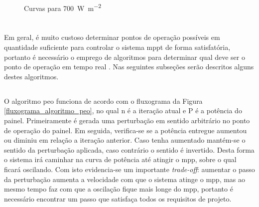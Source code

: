 \begin{figure}[!htpb]
\begin{center}
\caption{Curvas para \SI[per-mode=symbol]{700}{\watt\per\square\meter}}
\label{figura_comparacao_700}
\end{center}
\end{figure}

\section{}

Em geral, é muito custoso determinar pontos de operação possíveis em quantidade suficiente para controlar o sistema \gls{mppt} de forma satisfatória, portanto é necessário o emprego de algoritmos para determinar qual deve ser o ponto de operação em tempo real \cite{al2016}. Nas seguintes subseções serão descritos alguns destes algoritmos.

\subsection{}

O algoritmo \gls{peo} funciona de acordo com o fluxograma da Figura \ref{fluxograma_algoritmo_peo}, no qual n é a iteração atual e P é a potência do painel. Primeiramente é gerada uma perturbação em sentido arbitrário no ponto de operação do painel. Em seguida, verifica-se se a potência entregue aumentou ou diminiu em relação a iteração anterior. Caso tenha aumentado mantém-se o sentido da perturbação aplicada, caso contrário o sentido é invertido. Desta forma o sistema irá caminhar na curva de potência até atingir o \gls{mpp}, sobre o qual ficará oscilando. Com isto evidencia-se um importante \textit{trade-off}: aumentar o passo da perturbação aumenta a velocidade com que o sistema atinge o \gls{mpp}, mas ao mesmo tempo faz com que a oscilação fique mais longe do \gls{mpp}, portanto é necessário encontrar um passo que satisfaça todos os requisitos de projeto.

